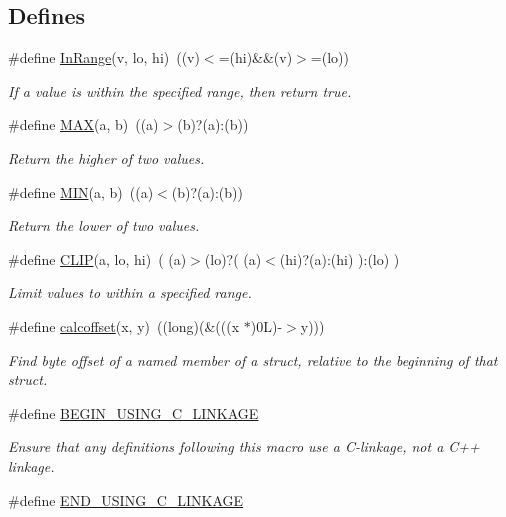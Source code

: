 \subsection*{Defines}
\begin{DoxyCompactItemize}
\item 
\#define \hyperlink{group__misc_ga1a07879e1cf90ff22dbd52a5408986dd}{InRange}(v, lo, hi)~((v)$<$=(hi)\&\&(v)$>$=(lo))
\begin{DoxyCompactList}\small\item\em If a value is within the specified range, then return true. \item\end{DoxyCompactList}\item 
\#define \hyperlink{group__misc_gafa99ec4acc4ecb2dc3c2d05da15d0e3f}{MAX}(a, b)~((a)$>$(b)?(a):(b))
\begin{DoxyCompactList}\small\item\em Return the higher of two values. \item\end{DoxyCompactList}\item 
\#define \hyperlink{group__misc_ga3acffbd305ee72dcd4593c0d8af64a4f}{MIN}(a, b)~((a)$<$(b)?(a):(b))
\begin{DoxyCompactList}\small\item\em Return the lower of two values. \item\end{DoxyCompactList}\item 
\#define \hyperlink{group__misc_ga79f6ccd4ae5e1eb6d56058350794f877}{CLIP}(a, lo, hi)~( (a)$>$(lo)?( (a)$<$(hi)?(a):(hi) ):(lo) )
\begin{DoxyCompactList}\small\item\em Limit values to within a specified range. \item\end{DoxyCompactList}\item 
\#define \hyperlink{group__misc_gaad95899dfbc7b5b8fe11921643ef46f0}{calcoffset}(x, y)~((long)(\&(((x $\ast$)0L)-\/$>$y)))
\begin{DoxyCompactList}\small\item\em Find byte offset of a named member of a struct, relative to the beginning of that struct. \item\end{DoxyCompactList}\item 
\#define \hyperlink{group__misc_ga06f35de4fc025809ab1cbb06f55b6495}{BEGIN\_\-USING\_\-C\_\-LINKAGE}
\begin{DoxyCompactList}\small\item\em Ensure that any definitions following this macro use a C-\/linkage, not a C++ linkage. \item\end{DoxyCompactList}\item 
\hypertarget{group__misc_gaffa4cac92b5d24cbccfe6c852de92a2e}{
\#define \hyperlink{group__misc_gaffa4cac92b5d24cbccfe6c852de92a2e}{END\_\-USING\_\-C\_\-LINKAGE}}
\label{group__misc_gaffa4cac92b5d24cbccfe6c852de92a2e}


\end{DoxyCompactItemize}
